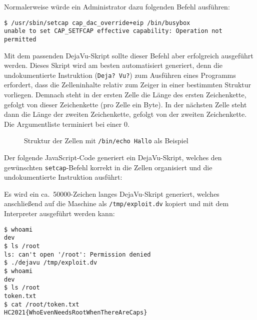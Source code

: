 Normalerweise würde ein Administrator dazu folgenden Befehl ausführen:
\begin{lstlisting}
$ /usr/sbin/setcap cap_dac_override+eip /bin/busybox
unable to set CAP_SETFCAP effective capability: Operation not permitted
\end{lstlisting}

Mit dem passenden DejaVu-Skript sollte dieser Befehl aber erfolgreich ausgeführt werden.
Dieses Skript wird am besten automatisiert generiert, denn die undokumentierte Instruktion (\texttt{Deja? Vu?}) zum Ausführen eines Programms erfordert, dass die Zelleninhalte relativ zum Zeiger in einer bestimmten Struktur vorliegen.
Demnach steht in der ersten Zelle die Länge des ersten Zeichenkette, gefolgt von dieser Zeichenkette (pro Zelle ein Byte).
In der nächsten Zelle steht dann die Länge der zweiten Zeichenkette, gefolgt von der zweiten Zeichenkette.
Die Argumentliste terminiert bei einer 0.

\begin{figure}[!ht]
\centering
{}
\caption{Struktur der Zellen mit \texttt{/bin/echo Hallo} als Beispiel}
\end{figure}

Der folgende JavaScript-Code generiert ein DejaVu-Skript, welches den gewünschten \texttt{setcap}-Befehl korrekt in die Zellen organisiert und die undokumentierte Instruktion ausführt:



Es wird ein ca.~50000-Zeichen langes DejaVu-Skript generiert, welches anschließend auf die Maschine als \texttt{/tmp/exploit.dv} kopiert und mit dem Interpreter ausgeführt werden kann:

\begin{lstlisting}
$ whoami
dev
$ ls /root
ls: can't open '/root': Permission denied
$ ./dejavu /tmp/exploit.dv
$ whoami
dev
$ ls /root
token.txt
$ cat /root/token.txt
HC2021{WhoEvenNeedsRootWhenThereAreCaps}
\end{lstlisting}
